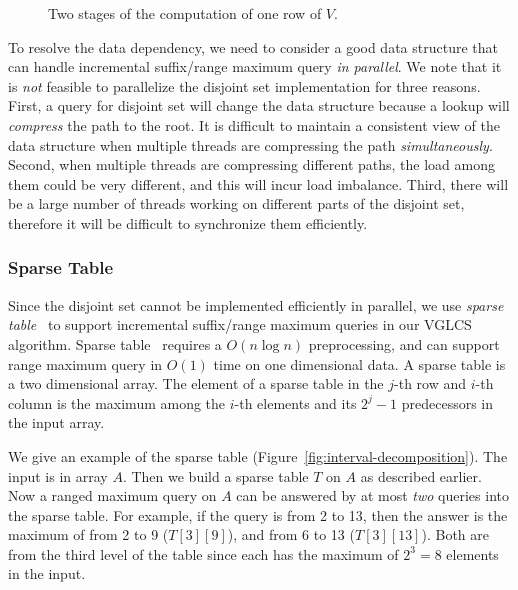 \begin{figure}[!thb]
  \centering {} 
  \caption{Two stages of the computation of one row of $V$.}
  \label{fig:fig-VGLCS-dp-rmq}
\end{figure}

To resolve the data dependency, we need to consider a good data
structure that can handle incremental suffix/range maximum query {\em in
parallel}.  We note that it is {\em not} feasible to parallelize the
disjoint set implementation for three reasons.  First, a query for
disjoint set will change the data structure because a lookup will {\em
compress} the path to the root.  It is difficult to maintain a
consistent view of the data structure when multiple threads are
compressing the path {\em simultaneously}.  Second, when multiple
threads are compressing different paths, the load among them could be
very different, and this will incur load imbalance.  Third, there will
be a large number of threads working on different parts of the disjoint
set, therefore it will be difficult to synchronize them efficiently.

\subsubsection{Sparse Table} \label{sec:sparse-table}

Since the disjoint set cannot be implemented efficiently in parallel,
we use {\em sparse table}~\cite{Berkman1993RecursiveSP} to support
incremental suffix/range maximum queries in our VGLCS algorithm.
Sparse table~\cite{Berkman1993RecursiveSP} requires a $O(n \log n)$
preprocessing, and can support range maximum query in $O(1)$ time on
one dimensional data.  A sparse table is a two dimensional array.  The
element of a sparse table in the $j$-th row and $i$-th column is the
maximum among the $i$-th elements and its $2^j - 1$ predecessors in
the input array.

We give an example of the sparse table
(Figure~\ref{fig:interval-decomposition}).  The input is in array $A$.
Then we build a sparse table $T$ on $A$ as described earlier.  Now a
ranged maximum query on $A$ can be answered by at most {\em two} queries
into the sparse table.  For example, if the query is from 2 to 13, then
the answer is the maximum of from 2 to 9 ($T[3][9]$), and from 6 to 13
($T[3][13]$).  Both are from the third level of the table since each has
the maximum of $2^3 = 8$ elements in the input.

